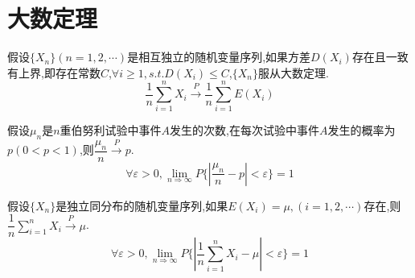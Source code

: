 \section{大数定理}
\begin{theorem}[切比雪夫大数定理]
	假设$\{X_{n}\}(n=1,2,\cdots)$是相互独立的随机变量序列,如果方差$D(X_{i})$存在且一致有上界,即存在常数$C$,$\forall i\geq 1, s.t. D(X_{i})\leq C$,$\{X_{n}\}$服从大数定理.
	$$\dfrac{1}{n}\sum\limits_{i=1}^{n}X_{i}\stackrel{P}{\longrightarrow}\dfrac{1}{n}\sum\limits_{i=1}^{n}E(X_{i})$$
\end{theorem}
\begin{theorem}[伯努利大数定理]
	假设$\mu_{n}$是$n$重伯努利试验中事件$A$发生的次数,在每次试验中事件$A$发生的概率为$p(0<p<1)$,则$\dfrac{\mu_{n}}{n}\stackrel{P}{\longrightarrow}p$.
	$$\forall \varepsilon>0,\lim\limits_{n\Rightarrow \infty}P\{|\dfrac{\mu_{n}}{n}-p|<\varepsilon\}=1$$
\end{theorem}
\begin{theorem}[辛钦大数定理]
	假设$\{X_{n}\}$是独立同分布的随机变量序列,如果$E(X_{i})=\mu,(i=1,2,\cdots)$存在,则$\dfrac{1}{n}\sum\limits_{i=1}^{n}X_{i}\stackrel{P}{\longrightarrow}\mu$.
	$$\forall \varepsilon>0,\lim\limits_{n\Rightarrow \infty}P\{|\dfrac{1}{n}\sum\limits_{i=1}^{n}X_{i}-\mu|<\varepsilon\}=1$$
\end{theorem}
